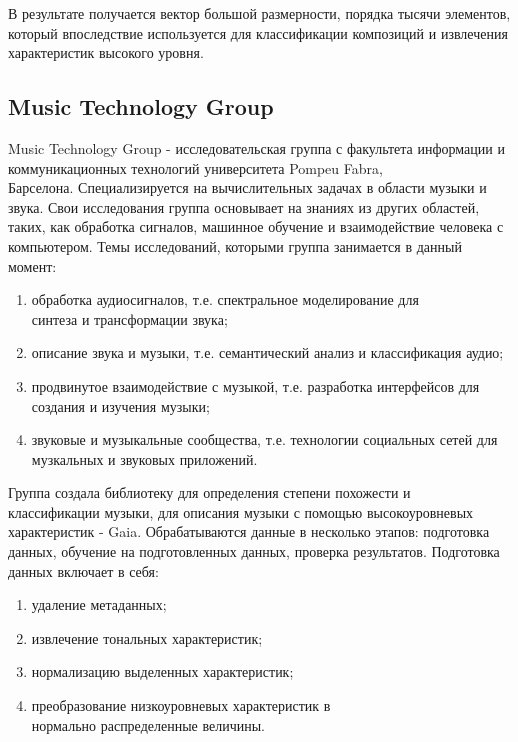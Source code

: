 В результате получается вектор большой размерности, порядка тысячи элементов, который впоследствие используется для классификации композиций и извлечения характеристик высокого уровня.

\subsection{Music Technology Group}
\label{sec:analogues:mtg}
Music Technology Group - исследовательская группа с факультета информации и коммуникационных технологий университета Pompeu Fabra, \\Барселона. Специализируется на вычислительных задачах в области музыки и звука. Свои исследования группа основывает на знаниях из других областей, таких, как обработка сигналов, машинное обучение и взаимодействие человека с компьютером. Темы исследований, которыми группа занимается в данный момент:
\begin{enumerate}
    \item обработка аудиосигналов, т.е. спектральное моделирование для \\синтеза и трансформации звука;
    \item описание звука и музыки, т.е. семантический анализ и классификация аудио;
    \item продвинутое взаимодействие с музыкой, т.е. разработка интерфейсов для создания и изучения музыки;
    \item звуковые и музыкальные сообщества, т.е. технологии социальных сетей для музкальных и звуковых приложений.
\end{enumerate}

Группа создала библиотеку для определения степени похожести и \\классификации музыки, для описания музыки с помощью высокоуровневых характеристик - Gaia. Обрабатываются данные в несколько этапов: подготовка данных, обучение на подготовленных данных, проверка результатов.
Подготовка данных включает в себя:
\begin{enumerate}
  \item удаление метаданных;
  \item извлечение тональных характеристик;
  \item нормализацию выделенных характеристик;
  \item преобразование низкоуровневых характеристик в \\нормально распределенные величины.
\end{enumerate}

